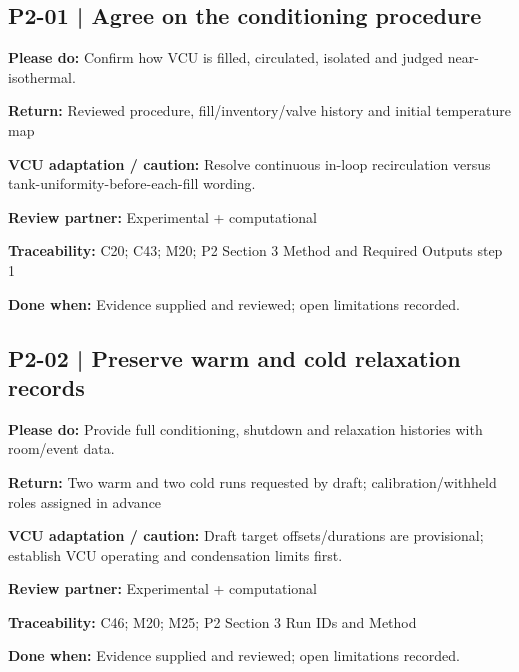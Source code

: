 \documentclass[11pt]{article}
\begin{document}
\par\noindent\begin{minipage}{\textwidth}\small\setlength{\parskip}{2pt}
\subsection*{P2-01 | Agree on the conditioning procedure}
\textbf{Please do:} Confirm how VCU is filled, circulated, isolated and judged near-isothermal.\par
\textbf{Return:} Reviewed procedure, fill/inventory/valve history and initial temperature map\par
\textbf{VCU adaptation / caution:} Resolve continuous in-loop recirculation versus tank-uniformity-before-each-fill wording.\par
\textbf{Review partner:} Experimental + computational\par
\textbf{Traceability:} C20; C43; M20; P2 Section 3 Method and Required Outputs step 1\par
\textbf{Done when:} Evidence supplied and reviewed; open limitations recorded.\par
\end{minipage}\par\vspace{8pt}
\par\noindent\begin{minipage}{\textwidth}\small\setlength{\parskip}{2pt}
\subsection*{P2-02 | Preserve warm and cold relaxation records}
\textbf{Please do:} Provide full conditioning, shutdown and relaxation histories with room/event data.\par
\textbf{Return:} Two warm and two cold runs requested by draft; calibration/withheld roles assigned in advance\par
\textbf{VCU adaptation / caution:} Draft target offsets/durations are provisional; establish VCU operating and condensation limits first.\par
\textbf{Review partner:} Experimental + computational\par
\textbf{Traceability:} C46; M20; M25; P2 Section 3 Run IDs and Method\par
\textbf{Done when:} Evidence supplied and reviewed; open limitations recorded.\par
\end{minipage}\par\vspace{8pt}
\end{document}

